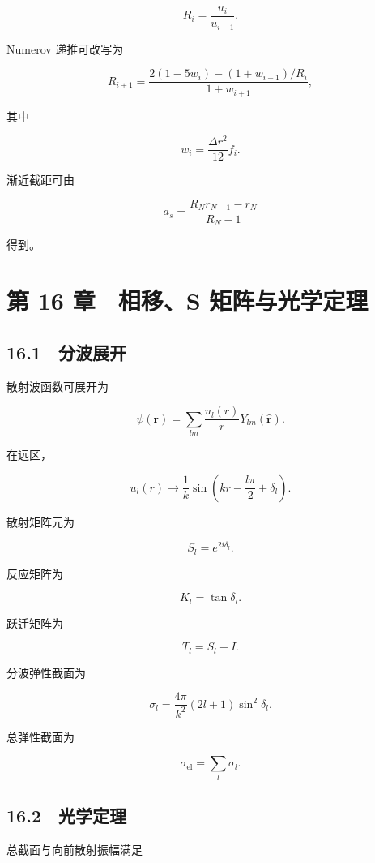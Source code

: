 \documentclass[
  a4paper,
]{ctexbook}
\begin{document}
\[
R_i=\frac{u_i}{u_{i-1}}.
\]

Numerov 递推可改写为

\[
R_{i+1}
=
\frac{
2(1-5w_i)-(1+w_{i-1})/R_i
}
{1+w_{i+1}},
\]

其中

\[
w_i=\frac{\Delta r^2}{12}f_i.
\]

渐近截距可由

\[
a_s
=
\frac{R_Nr_{N-1}-r_N}{R_N-1}
\]

得到。

\hypertarget{ux7b2c-16-ux7ae0-ux76f8ux79fbs-ux77e9ux9635ux4e0eux5149ux5b66ux5b9aux7406}{%
\section{第 16 章　相移、S
矩阵与光学定理}\label{ux7b2c-16-ux7ae0-ux76f8ux79fbs-ux77e9ux9635ux4e0eux5149ux5b66ux5b9aux7406}}

\hypertarget{ux5206ux6ce2ux5c55ux5f00}{%
\subsection{16.1　分波展开}\label{ux5206ux6ce2ux5c55ux5f00}}

散射波函数可展开为

\[
\psi(\mathbf r)
=
\sum_{lm}
\frac{u_l(r)}{r}
Y_{lm}(\hat{\mathbf r}).
\]

在远区，

\[
u_l(r)
\rightarrow
\frac{1}{k}
\sin\left(kr-\frac{l\pi}{2}+\delta_l\right).
\]

散射矩阵元为

\[
S_l=e^{2i\delta_l}.
\]

反应矩阵为

\[
K_l=\tan\delta_l.
\]

跃迁矩阵为

\[
T_l=S_l-I.
\]

分波弹性截面为

\[
\sigma_l
=
\frac{4\pi}{k^2}(2l+1)\sin^2\delta_l.
\]

总弹性截面为

\[
\sigma_{\mathrm{el}}
=
\sum_l\sigma_l.
\]

\hypertarget{ux5149ux5b66ux5b9aux7406}{%
\subsection{16.2　光学定理}\label{ux5149ux5b66ux5b9aux7406}}

总截面与向前散射振幅满足
\end{document}
